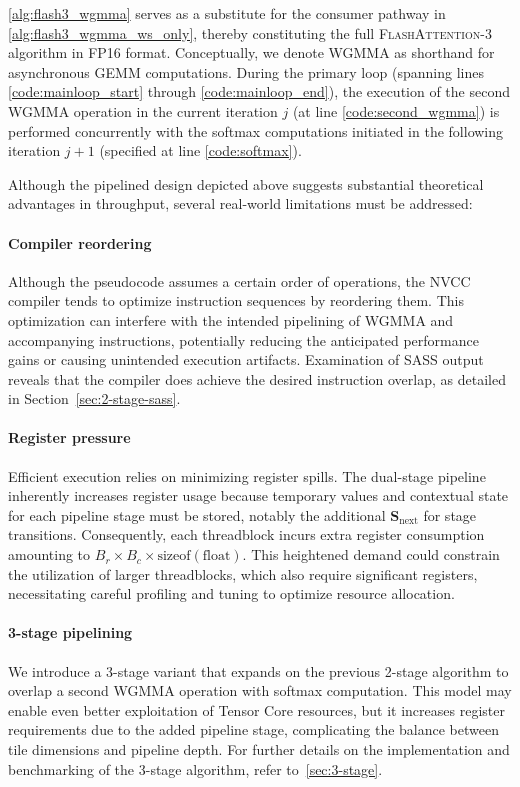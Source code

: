 \cref{alg:flash3_wgmma} serves as a substitute for the consumer pathway in \cref{alg:flash3_wgmma_ws_only}, thereby constituting the full \textsc{FlashAttention-3} algorithm in FP16 format. Conceptually, we denote WGMMA as shorthand for asynchronous GEMM computations. During the primary loop (spanning lines \ref{code:mainloop_start} through \ref{code:mainloop_end}), the execution of the second WGMMA operation in the current iteration $j$ (at line \ref{code:second_wgmma}) is performed concurrently with the softmax computations initiated in the following iteration $j+1$ (specified at line \ref{code:softmax}).

Although the pipelined design depicted above suggests substantial theoretical advantages in throughput, several real-world limitations must be addressed:

\paragraph{Compiler reordering} Although the pseudocode assumes a certain order of operations, the NVCC compiler tends to optimize instruction sequences by reordering them. This optimization can interfere with the intended pipelining of WGMMA and accompanying instructions, potentially reducing the anticipated performance gains or causing unintended execution artifacts. Examination of SASS output reveals that the compiler does achieve the desired instruction overlap, as detailed in Section~\ref{sec:2-stage-sass}.

\paragraph{Register pressure} Efficient execution relies on minimizing register spills. The dual-stage pipeline inherently increases register usage because temporary values and contextual state for each pipeline stage must be stored, notably the additional $\mathbf{S}_{\mathrm{next}}$ for stage transitions. Consequently, each threadblock incurs extra register consumption amounting to $B_r \times B_c \times \text{sizeof}(\text{float})$. This heightened demand could constrain the utilization of larger threadblocks, which also require significant registers, necessitating careful profiling and tuning to optimize resource allocation.

\paragraph{3-stage pipelining} We introduce a 3-stage variant that expands on the previous 2-stage algorithm to overlap a second WGMMA operation with softmax computation. This model may enable even better exploitation of Tensor Core resources, but it increases register requirements due to the added pipeline stage, complicating the balance between tile dimensions and pipeline depth. For further details on the implementation and benchmarking of the 3-stage algorithm, refer to~\cref{sec:3-stage}.

